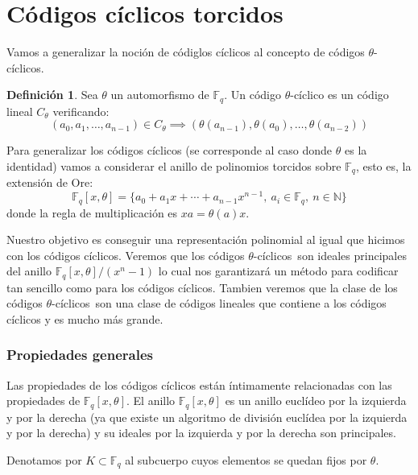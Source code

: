 \documentclass[a4paper,11pt]{article}
\numberwithin{equation}{section}
\theoremstyle{definition} %
\newtheorem{definicion}{Definición}[section]
\newcommand{\Fq}{\mathbb{F}_q}
\newcommand{\Co}{C_{\theta}}
\newcommand{\Fqxo}{\Fq[x, \theta]}
\newcommand{\Fxx}{\Fq[x, \theta]/(x^n - 1)}
\newcommand{\tcs}{$\theta$-cíclicos\ }
\begin{document}
    \section{Códigos cíclicos torcidos}

    Vamos a generalizar la noción de códiglos cíclicos al concepto de códigos $\theta$-cíclicos.

    \begin{definicion}
        Sea $\theta$ un automorfismo de $\Fq$. Un código $\theta$-cíclico es un código lineal $\Co$ verificando:
        $$
        (a_0, a_1, \dots, a_{n-1}) \in \Co \implies (\theta(a_{n-1}), \theta(a_0), \dots, \theta(a_{n-2}))
        $$
    \end{definicion}

    Para generalizar los códigos cíclicos (se corresponde al caso donde $\theta$ es la identidad) vamos a considerar el anillo de polinomios torcidos sobre $\Fq$, esto es, la extensión de Ore:
    $$
        \Fqxo = \{a_0 + a_1 x + \cdots + a_{n-1} x^{n-1},\ a_i \in \Fq,\ n \in \mathbb{N}\}
    $$
    donde la regla de multiplicación es $x a = \theta(a) x$.

    Nuestro objetivo es conseguir una representación polinomial al igual que hicimos con los códigos cíclicos. Veremos que los códigos \tcs son ideales principales del anillo $\Fxx$ lo cual nos garantizará un método para codificar tan sencillo como para los códigos cíclicos. Tambien veremos que la clase de los códigos \tcs son una clase de códigos lineales que contiene a los códigos cíclicos y es mucho más grande.

    \subsubsection{Propiedades generales}

    Las propiedades de los códigos cíclicos están íntimamente relacionadas con las propiedades de $\Fqxo$. El anillo $\Fqxo$ es un anillo euclídeo por la izquierda y por la derecha (ya que existe un algoritmo de división euclídea por la izquierda y por la derecha) y su ideales por la izquierda y por la derecha son principales.


    Denotamos por $K \subset \Fq$ al subcuerpo cuyos elementos se quedan fijos por $\theta$.
\end{document}
